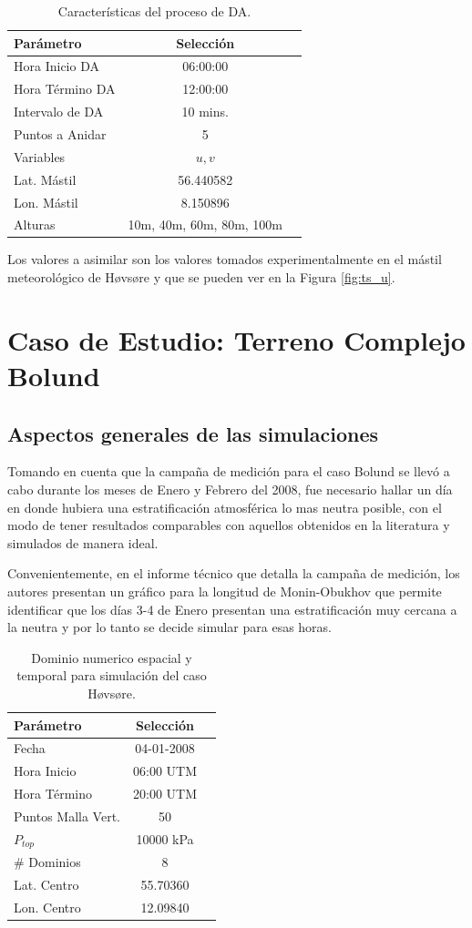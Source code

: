 \begin{table}[h!]
	\caption{Características del proceso de DA.}\label{tab:c2DA}
	\centering\footnotesize
	\begin{tabular}{lcc}
		\toprule
		Parámetro & Selección \\
		\midrule
		Hora Inicio	DA 	 & 06:00:00   \\
		Hora Término DA	 		 & 12:00:00  \\
		Intervalo de DA	&	10 mins. \\
		Puntos a Anidar	 	 & 5   \\
		Variables	& $u,v$   \\
		Lat. Mástil	& 56.440582   \\
		Lon. Mástil	& 8.150896   \\
		Alturas 	& 10m, 40m, 60m, 80m, 100m \\
		\bottomrule
	\end{tabular}
\end{table}

Los valores a asimilar son los valores tomados experimentalmente en el mástil meteorológico de Høvsøre y que se pueden ver en la Figura \ref{fig:ts_u}.

\newpage
\section{Caso de Estudio: Terreno Complejo Bolund}
\subsection{Aspectos generales de las simulaciones}
Tomando en cuenta que la campaña de medición para el caso Bolund se llevó a cabo durante los meses de Enero y Febrero del 2008, fue necesario hallar un día en donde hubiera una estratificación atmosférica lo mas neutra posible, con el modo de tener resultados comparables con aquellos obtenidos en la literatura y simulados de manera ideal.

Convenientemente, en el informe técnico que detalla la campaña de medición, los autores presentan un gráfico para la longitud de Monin-Obukhov que permite identificar que los días 3-4 de Enero presentan una estratificación muy cercana a la neutra y por lo tanto se decide simular para esas horas.
\begin{table}[h!]
	\caption{Dominio numerico espacial y temporal para simulación del caso Høvsøre.}\label{tab:c3exp}
	\centering\footnotesize
	\begin{tabular}{lcc}
		\toprule
		Parámetro & Selección \\
		\midrule
		Fecha	 	 & 04-01-2008   \\
		Hora Inicio	 	 & 06:00 UTM\\
		Hora Término	 		 & 20:00 UTM\\
		Puntos Malla Vert.	 	 & 50   \\
		$P_{top}$ 	& 10000 kPa\\
		\# Dominios	& 8   \\
		Lat. Centro	& 55.70360   \\
		Lon. Centro	& 12.09840   \\
		\bottomrule
	\end{tabular}
\end{table}

